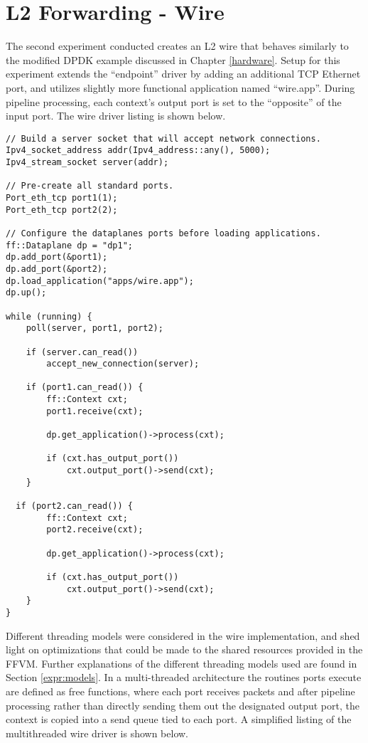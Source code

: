 \section{L2 Forwarding - Wire}
\label{expr:wire}
The second experiment conducted creates an L2 wire that behaves similarly
to the modified DPDK example discussed in Chapter \ref{hardware}. Setup for
this experiment extends the ``endpoint'' driver by adding an additional TCP
Ethernet port, and utilizes slightly more functional application named
``wire.app''. During pipeline processing, each context's output port is set
to the ``opposite'' of the input port. The wire driver listing is shown below.

\begin{lstlisting}
// Build a server socket that will accept network connections.
Ipv4_socket_address addr(Ipv4_address::any(), 5000);
Ipv4_stream_socket server(addr);

// Pre-create all standard ports.
Port_eth_tcp port1(1);
Port_eth_tcp port2(2);

// Configure the dataplanes ports before loading applications.
ff::Dataplane dp = "dp1";
dp.add_port(&port1);
dp.add_port(&port2);
dp.load_application("apps/wire.app");
dp.up();

while (running) {
	poll(server, port1, port2);

	if (server.can_read())
		accept_new_connection(server);

	if (port1.can_read()) {
		ff::Context cxt;
		port1.receive(cxt);

		dp.get_application()->process(cxt);

		if (cxt.has_output_port())
			cxt.output_port()->send(cxt);
	}

  if (port2.can_read()) {
		ff::Context cxt;
		port2.receive(cxt);

		dp.get_application()->process(cxt);

		if (cxt.has_output_port())
			cxt.output_port()->send(cxt);
	}
}
\end{lstlisting}

Different threading models were considered in the wire implementation, and shed
light on optimizations that could be made to the shared resources provided in
the FFVM. Further explanations of the different threading models used are found
in Section \ref{expr:models}. In a multi-threaded architecture the routines
ports execute are defined as free functions, where each port receives packets
and after pipeline processing rather than directly sending them out the
designated output port, the context is copied into a send queue tied to each
port. A simplified listing of the multithreaded wire driver is shown below.

